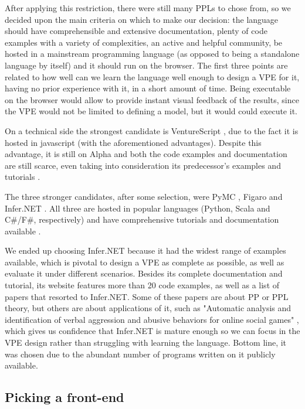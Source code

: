After applying this restriction, there were still many PPLs to chose from, so
we decided upon the main criteria on which to make our decision: the language
should have comprehensible and extensive documentation, plenty of code examples
with a variety of complexities, an active and helpful community, be hosted in
a mainstream programming language (as opposed to being a standalone language by itself)
and it should run on the browser. The first three points are related to how well
can we learn the language well enough to design a VPE for it, having no prior
experience with it, in a short amount of time. Being executable on the browser
would allow to provide instant visual feedback of the results, since the VPE
would not be limited to defining a model, but it would could execute it.

On a technical side the strongest candidate is VentureScript \cite{probcomp},
due to the fact it is hosted in javascript (with the aforementioned advantages).
Despite this advantage, it is still on Alpha and both the code examples and
documentation are still scarce, even taking into consideration its predecessor's
examples \cite{forestdb} and tutorials \cite{church}.

The three stronger candidates, after some selection, were PyMC \cite{pymc},
Figaro \cite{figaro} and Infer.NET \cite{InferNET14}. All three are hosted in popular languages
(Python, Scala and C#/F#, respectively) and have comprehensive tutorials and
documentation available \cite{pymct}\cite{figarot}\cite{InferNET14t}.

We ended up choosing Infer.NET because it had the widest range of examples
available, which is pivotal to design a VPE as complete as possible, as well
as evaluate it under different scenarios. Besides its complete documentation
and tutorial, its website features more than 20 code examples, as well as a list
of papers that resorted to Infer.NET. Some of these papers are about PP or PPL theory,
but others are about applications of it, such as "Automatic analysis and
identification of verbal aggression and abusive behaviors for online social
games" \cite{balci2015automatic}, which gives us confidence that Infer.NET is
mature enough so we can focus in the VPE design rather than struggling with
learning the language. Bottom line, it was chosen due to the abundant number of
programs written on it publicly available.

\subsection{Picking a front-end}

